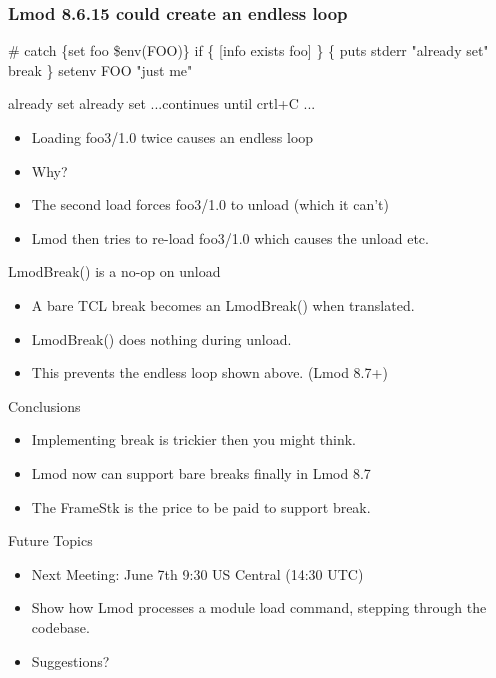\documentclass{beamer}
\begin{document}
\begin{frame}[fragile]
    \frametitle{Lmod 8.6.15 could create an endless loop}
 {\tiny
    \begin{semiverbatim}
#%
catch \{set foo \$env(FOO)\}
if \{ [info exists foo] \} \{
  puts stderr "already set"
  break
\}
setenv FOO "just me"

already set
already set
...continues until crtl+C ...
    \end{semiverbatim}
}
  \begin{itemize}
    \item Loading foo3/1.0 twice causes an endless loop
    \item Why?
    \item The second load forces foo3/1.0 to unload (which it can't)
    \item Lmod then tries to re-load foo3/1.0 which causes the unload etc.
  \end{itemize}

\end{frame}

\begin{frame}{LmodBreak() is a no-op on unload}
  \begin{itemize}
    \item A bare TCL break becomes an LmodBreak() when translated.
    \item LmodBreak() does nothing during unload.
    \item This prevents the endless loop shown above. (Lmod 8.7+)
  \end{itemize}
\end{frame}

\begin{frame}{Conclusions}
  \begin{itemize}
    \item Implementing break is trickier then you might think.
    \item Lmod now can support bare breaks finally in Lmod 8.7
    \item The FrameStk is the price to be paid to support break.
  \end{itemize}
\end{frame}

\begin{frame}{Future Topics}
  \begin{itemize}
    \item Next Meeting: June 7th 9:30 US Central (14:30 UTC)
    \item Show how Lmod processes a module load command, stepping
      through the codebase.
    \item Suggestions?
  \end{itemize}
\end{frame}
\end{document}
